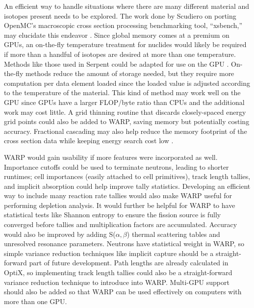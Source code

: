 \documentclass[preprint,12pt]{elsarticle}
\begin{document}
An efficient way to handle situations where there are many different material and isotopes present needs to be explored.  The work done by Scudiero on porting OpenMC's macroscopic cross section processing benchmarking tool, ``xsbench,'' may elucidate this endeavor \cite{openmc,scudiero}.   Since global memory comes at a premium on GPUs, an on-the-fly temperature treatment for nuclides would likely be required if more than a handful of isotopes are desired at more than one temperature.  Methods like those used in Serpent could be adapted for use on the GPU \cite{serpent}.  On-the-fly methods reduce the amount of storage needed, but they require more computation per data element loaded since the loaded value is adjusted according to the temperature of the material.  This kind of method may work well on the GPU since GPUs have a larger FLOP/byte ratio than CPUs and the additional work may cost little.  A grid thinning routine that discards closely-spaced energy grid points could also be added to WARP, saving memory but potentially costing accuracy.  Fractional cascading may also help reduce the memory footprint of the cross section data while keeping energy search cost low \cite{Lund2015}. 

WARP would gain usability if more features were incorporated as well.  Importance cutoffs could be used to terminate neutrons, leading to shorter runtimes; cell importances (easily attached to cell primitives), track length tallies, and implicit absorption could help improve tally statistics.  Developing an efficient way to include many reaction rate tallies would also make WARP useful for performing depletion analysis.  It would further be helpful for WARP to have statistical tests like Shannon entropy to ensure the fission source is fully converged before tallies and multiplication factors are accumulated.  Accuracy would also be improved by adding S($\alpha,\beta$) thermal scattering tables and unresolved resonance parameters.  Neutrons have statistical weight in WARP, so simple variance reduction techniques like implicit capture should be a straight-forward part of future development.  Path lengths are already calculated in OptiX, so implementing track length tallies could also be a straight-forward variance reduction technique to introduce into WARP.  Multi-GPU support should also be added so that WARP can be used effectively on computers with more than one GPU.

\end{document}
